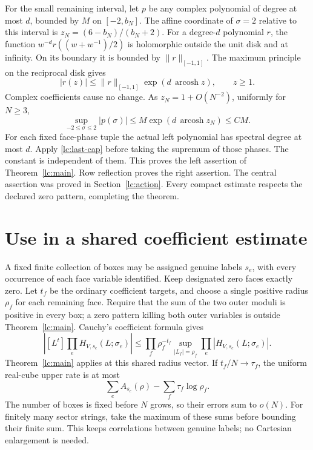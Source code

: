 \documentclass[11pt]{article}
\numberwithin{equation}{section}
\theoremstyle{remark}\newtheorem{remark}[theorem]{Remark}
\begin{document}
For the small remaining interval, let \(p\) be any complex polynomial
of degree at most \(d\), bounded by \(M\) on \([-2,b_N]\).
The affine coordinate of \(\sigma=2\) relative to this interval is
\(z_N=(6-b_N)/(b_N+2)\).
For a degree-\(d\) polynomial \(r\), the function
\(w^{-d}r((w+w^{-1})/2)\) is holomorphic outside the unit disk and
at infinity. On its boundary it is bounded by \(\|r\|_{[-1,1]}\).
The maximum principle on the reciprocal disk gives
\[
 |r(z)|\le\|r\|_{[-1,1]}\exp(d\,\operatorname{arcosh}z),\qquad z\ge1.
\]
Complex coefficients cause no change. As \(z_N=1+O(N^{-2})\),
uniformly for \(N\ge3\),
\begin{equation}\label{lc:last-cap}
 \sup_{-2\le\sigma\le2}|p(\sigma)|
      \le M\exp(d\,\operatorname{arcosh}z_N)\le C M.
\end{equation}
For each fixed face-phase tuple the actual left polynomial has
spectral degree at most \(d\). Apply \eqref{lc:last-cap} before
taking the supremum of those phases. The constant is independent
of them. This proves the left assertion of Theorem~\ref{lc:main}.
Row reflection proves the right assertion. The central assertion
was proved in Section~\ref{lc:action}. Every compact estimate
respects the declared zero pattern, completing the theorem.

\section{Use in a shared coefficient estimate}
A fixed finite collection of boxes may be assigned genuine labels
\(s_e\), with every occurrence of each face variable identified.
Keep designated zero faces exactly zero. Let \(t_f\) be the ordinary
coefficient targets, and choose a single positive radius \(\rho_f\)
for each remaining face. Require that the sum of the two outer moduli
is positive in every box; a zero pattern killing both outer variables
is outside Theorem~\ref{lc:main}. Cauchy's coefficient formula gives
\[
 \left|[L^t]\prod_eH_{V,s_e}(L;\sigma_e)\right|
 \le\prod_f\rho_f^{-t_f}
       \sup_{|L_f|=\rho_f}\prod_e|H_{V,s_e}(L;\sigma_e)|.
\]
Theorem~\ref{lc:main} applies at this shared radius vector. If
\(t_f/N\to\tau_f\), the uniform real-cube upper rate is at most
\[
                      \sum_eA_{s_e}(\rho)-\sum_f\tau_f\log\rho_f .
\]
The number of boxes is fixed before \(N\) grows, so their errors sum
to \(o(N)\). For finitely many sector strings, take the maximum of
these sums before bounding their finite sum. This keeps correlations
between genuine labels; no Cartesian enlargement is needed.
\end{document}
